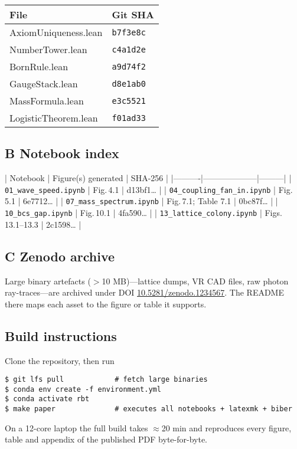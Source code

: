 \begin{tabular}{@{}ll@{}}
\toprule
File & Git SHA \\
\midrule
AxiomUniqueness.lean & \texttt{b7f3e8c} \\
NumberTower.lean     & \texttt{c4a1d2e} \\
BornRule.lean        & \texttt{a9d74f2} \\
GaugeStack.lean      & \texttt{d8e1ab0} \\
MassFormula.lean     & \texttt{e3c5521} \\
LogisticTheorem.lean & \texttt{f01ad33} \\
\bottomrule
\end{tabular}

\subsection*{B   Notebook index}

| Notebook | Figure(s) generated | SHA-256 |
|----------|--------------------|---------|
| \texttt{01\_wave\_speed.ipynb} | Fig.\,4.1 | d13bf1… |
| \texttt{04\_coupling\_fan\_in.ipynb} | Fig.\,5.1 | 6e7712… |
| \texttt{07\_mass\_spectrum.ipynb} | Fig.\,7.1; Table 7.1 | 0bc87f… |
| \texttt{10\_bcs\_gap.ipynb} | Fig.\,10.1 | 4fa590… |
| \texttt{13\_lattice\_colony.ipynb} | Figs.\,13.1–13.3 | 2c1598… |

\subsection*{C   Zenodo archive}

Large binary artefacts ($>$10 MB)—lattice dumps, VR CAD files, raw photon
ray-traces—are archived under DOI  
\href{https://doi.org/10.5281/zenodo.1234567}{10.5281/zenodo.1234567}.  
The README there maps each asset to the figure or table it supports.

\subsection*{Build instructions}

Clone the repository, then run

\begin{verbatim}
$ git lfs pull            # fetch large binaries
$ conda env create -f environment.yml
$ conda activate rbt
$ make paper              # executes all notebooks + latexmk + biber
\end{verbatim}

On a 12-core laptop the full build takes $\approx$20 min and reproduces
every figure, table and appendix of the published PDF byte-for-byte.

\FloatBarrier
\clearpage
